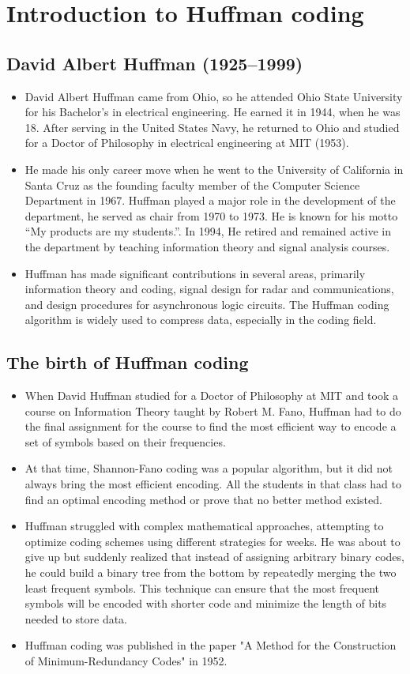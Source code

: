 \section{Introduction to Huffman coding}
\subsection{David Albert Huffman (1925–1999)}
\begin{itemize}
\item David Albert Huffman came from Ohio, so he attended Ohio State University for his Bachelor's in electrical engineering. He earned it in 1944, when he was 18. After serving in the United States Navy, he returned to Ohio and studied for a Doctor of Philosophy in electrical engineering at MIT (1953).
\item He made his only career move when he went to the University of California in Santa Cruz as the founding faculty member of the Computer Science Department in 1967. Huffman played a major role in the development of the department, he served as chair from 1970 to 1973. He is known for his motto “My products are my students.”. In 1994, He retired and remained active in the department by teaching information theory and signal analysis courses.\cite{salomon2010handbook}
\item Huffman has made significant contributions in several areas, primarily information theory and coding, signal design for radar and communications, and design procedures for asynchronous logic circuits. The Huffman coding algorithm is widely used to compress data, especially in the coding field.
\end{itemize}
\subsection{The birth of Huffman coding}
\begin{itemize}
\item When David Huffman studied for a Doctor of Philosophy at MIT and took a course on Information Theory taught by Robert M. Fano, Huffman had to do the final assignment for the course to find the most efficient way to encode a set of symbols based on their frequencies.
\item At that time, Shannon-Fano coding was a popular algorithm, but it did not always bring the most efficient encoding. All the students in that class had to find an optimal encoding method or prove that no better method existed.
\item Huffman struggled with complex mathematical approaches, attempting to optimize coding schemes using different strategies for weeks. He was about to give up but suddenly realized that instead of assigning arbitrary binary codes, he could build a binary tree from the bottom by repeatedly merging the two least frequent symbols. This technique can ensure that the most frequent symbols will be encoded with shorter code and minimize the length of bits needed to store data.
\item Huffman coding was published in the paper "A Method for the Construction of Minimum-Redundancy Codes" in 1952.
\end{itemize}
